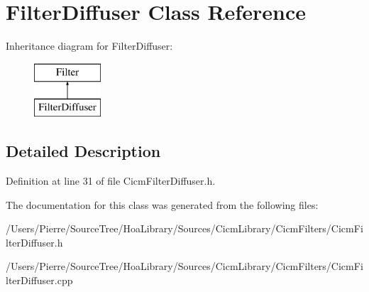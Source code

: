 \hypertarget{class_filter_diffuser}{\section{Filter\-Diffuser Class Reference}
\label{class_filter_diffuser}
}
Inheritance diagram for Filter\-Diffuser\-:\begin{figure}[H]
\begin{center}
\leavevmode
\includegraphics[height=2.000000cm]{class_filter_diffuser}
\end{center}
\end{figure}


\subsection{Detailed Description}


Definition at line 31 of file Cicm\-Filter\-Diffuser.\-h.



The documentation for this class was generated from the following files\-:\begin{DoxyCompactItemize}
\item 
/\-Users/\-Pierre/\-Source\-Tree/\-Hoa\-Library/\-Sources/\-Cicm\-Library/\-Cicm\-Filters/Cicm\-Filter\-Diffuser.\-h\item 
/\-Users/\-Pierre/\-Source\-Tree/\-Hoa\-Library/\-Sources/\-Cicm\-Library/\-Cicm\-Filters/Cicm\-Filter\-Diffuser.\-cpp\end{DoxyCompactItemize}
